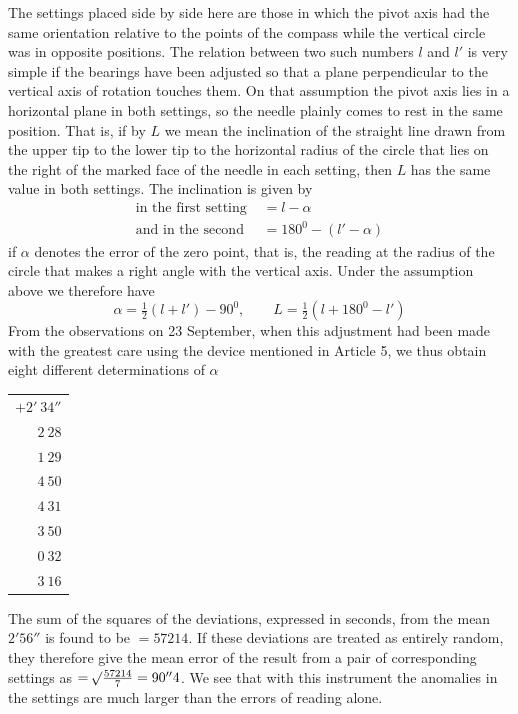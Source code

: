 The settings placed side by side here are those in which the pivot axis had the same orientation relative to the points of the compass while the vertical circle was in opposite positions. The relation between two such numbers $l$ and $l'$ is very simple if the bearings have been adjusted so that a plane perpendicular to the vertical axis of rotation touches them. On that assumption the pivot axis lies in a horizontal plane in both settings, so the needle plainly comes to rest in the same position. That is, if by $L$ we mean the inclination of the straight line drawn from the upper tip to the lower tip to the horizontal radius of the circle that lies on the right of the marked face of the needle in each setting, then $L$ has the same value in both settings. The inclination is given by
\[
\begin{aligned}
\text{in the first setting }&=l-\alpha\\
\text{and in the second }&=180^0-(l'-\alpha)
\end{aligned}
\]
if $\alpha$ denotes the error of the zero point, that is, the reading at the radius of the circle that makes a right angle with the vertical axis. Under the assumption above we therefore have
\[
\alpha=\tfrac{1}{2}(l+l')-90^0,\qquad L=\tfrac{1}{2}(l+180^0-l')
\]
From the observations on 23 September, when this adjustment had been made with the greatest care using the device mentioned in Article 5, we thus obtain eight different determinations of $\alpha$
\begin{center}
\begin{tabular}{r}
$+2'\ 34''$\\
$2\ 28$\\
$1\ 29$\\
$4\ 50$\\
$4\ 31$\\
$3\ 50$\\
$0\ 32$\\
$3\ 16$
\end{tabular}
\end{center}

The sum of the squares of the deviations, expressed in seconds, from the mean $2'56''$ is found to be $=57214$. If these deviations are treated as entirely random, they therefore give the mean error of the
result from a pair of corresponding settings as $=\mathord{{}^{}\!\surd}\frac{57214}{7}=90''4$. We see that with this instrument the anomalies in the settings are much larger than the errors of reading alone.


